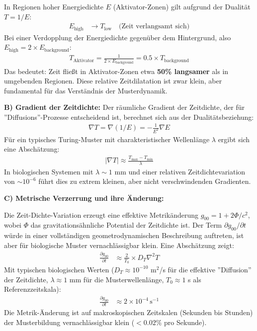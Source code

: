 \documentclass[12pt,a4paper]{article}
\begin{document}
	In Regionen hoher Energiedichte $E$ (Aktivator-Zonen) gilt aufgrund der Dualität $T = 1/E$:
	\begin{align*}
		E_{\text{high}} &\rightarrow T_{\text{low}} \quad \text{(Zeit verlangsamt sich)}
	\end{align*}
	Bei einer Verdopplung der Energiedichte gegenüber dem Hintergrund, also $E_{\text{high}} = 2 \times E_{\text{background}}$:
	\begin{align*}
		T_{\text{Aktivator}} = \frac{1}{2 \times E_{\text{background}}} = 0.5 \times T_{\text{background}}
	\end{align*}
	Das bedeutet: Zeit fließt in Aktivator-Zonen etwa \textbf{50\% langsamer} als in umgebenden Regionen. Diese relative Zeitdilatation ist zwar klein, aber fundamental für das Verständnis der Musterdynamik.
	
	\textbf{B) Gradient der Zeitdichte:}
	Der räumliche Gradient der Zeitdichte, der für ''Diffusions''-Prozesse entscheidend ist, berechnet sich aus der Dualitätsbeziehung:
	\begin{align*}
		\nabla T = \nabla(1/E) = -\frac{1}{E^2} \nabla E
	\end{align*}
	Für ein typisches Turing-Muster mit charakteristischer Wellenlänge $\lambda$ ergibt sich eine Abschätzung:
	\begin{align*}
		|\nabla T| \approx \frac{T_{\text{max}} - T_{\text{min}}}{\lambda}
	\end{align*}
	In biologischen Systemen mit $\lambda \sim 1$ mm und einer relativen Zeitdichtevariation von $\sim 10^{-6}$ führt dies zu extrem kleinen, aber nicht verschwindenden Gradienten.
	
	\textbf{C) Metrische Verzerrung und ihre Änderung:}
	
	Die Zeit-Dichte-Variation erzeugt eine effektive Metrikänderung $g_{00} = 1 + 2\Phi/c^2$, wobei $\Phi$ das gravitationsähnliche Potential der Zeitdichte ist. Der Term $\partial g_{00}/\partial t$ würde in einer vollständigen geometrodynamischen Beschreibung auftreten, ist aber für biologische Muster vernachlässigbar klein. Eine Abschätzung zeigt:
	\begin{align*}
		\frac{\partial g_{00}}{\partial t} &\approx \frac{2}{T_0} \times D_T \nabla^2 T
	\end{align*}
	Mit typischen biologischen Werten ($D_T \approx 10^{-10}$ m$^2$/s für die effektive ''Diffusion'' der Zeitdichte, $\lambda \approx 1$ mm für die Musterwellenlänge, $T_0 \approx 1$ s als Referenzzeitskala):
	\begin{align*}
		\frac{\partial g_{00}}{\partial t} &\approx 2 \times 10^{-4} \, \text{s}^{-1}
	\end{align*}
	Die Metrik-Änderung ist auf makroskopischen Zeitskalen (Sekunden bis Stunden) der Musterbildung vernachlässigbar klein ($< 0.02\%$ pro Sekunde).
	
\end{document}
